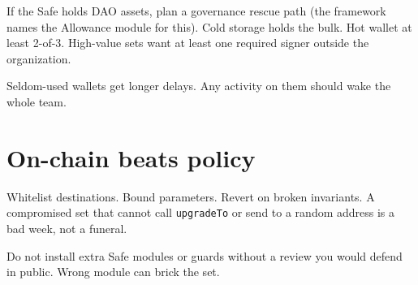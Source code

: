 If the Safe holds DAO assets, plan a governance
rescue path (the framework names the Allowance
module for this). Cold storage holds the bulk.
Hot wallet at least 2-of-3. High-value sets want
at least one required signer outside the
organization.

Seldom-used wallets get longer delays. Any
activity on them should wake the whole team.

\section{On-chain beats policy}

Whitelist destinations. Bound parameters. Revert
on broken invariants. A compromised set that
cannot call \texttt{upgradeTo} or send to a random
address is a bad week, not a funeral.

Do not install extra Safe modules or guards
without a review you would defend in public.
Wrong module can brick the set.
